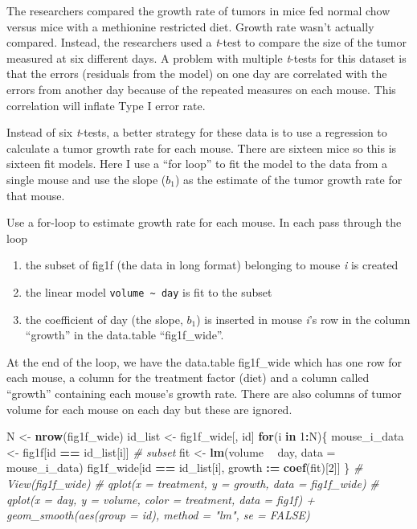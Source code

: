 \documentclass[]{book}
\newenvironment{Shaded}{\begin{snugshade}}{\end{snugshade}}
\newcommand{\CommentTok}[1]{\textcolor[rgb]{0.56,0.35,0.01}{\textit{#1}}}
\newcommand{\ControlFlowTok}[1]{\textcolor[rgb]{0.13,0.29,0.53}{\textbf{#1}}}
\newcommand{\DataTypeTok}[1]{\textcolor[rgb]{0.13,0.29,0.53}{#1}}
\newcommand{\DecValTok}[1]{\textcolor[rgb]{0.00,0.00,0.81}{#1}}
\newcommand{\ErrorTok}[1]{\textcolor[rgb]{0.64,0.00,0.00}{\textbf{#1}}}
\newcommand{\KeywordTok}[1]{\textcolor[rgb]{0.13,0.29,0.53}{\textbf{#1}}}
\newcommand{\NormalTok}[1]{#1}
\newcommand{\OperatorTok}[1]{\textcolor[rgb]{0.81,0.36,0.00}{\textbf{#1}}}
\newcommand{\StringTok}[1]{\textcolor[rgb]{0.31,0.60,0.02}{#1}}
\providecommand{\tightlist}{%
  \setlength{\itemsep}{0pt}\setlength{\parskip}{0pt}}
\begin{document}
The researchers compared the growth rate of tumors in mice fed normal chow versus mice with a methionine restricted diet. Growth rate wasn't actually compared. Instead, the researchers used a \emph{t}-test to compare the size of the tumor measured at six different days. A problem with multiple \emph{t}-tests for this dataset is that the errors (residuals from the model) on one day are correlated with the errors from another day because of the repeated measures on each mouse. This correlation will inflate Type I error rate.

Instead of six \emph{t}-tests, a better strategy for these data is to use a regression to calculate a tumor growth rate for each mouse. There are sixteen mice so this is sixteen fit models. Here I use a ``for loop'' to fit the model to the data from a single mouse and use the slope (\(b_1\)) as the estimate of the tumor growth rate for that mouse.

Use a for-loop to estimate growth rate for each mouse. In each pass through the loop

\begin{enumerate}
\def\labelenumi{\arabic{enumi}.}
\tightlist
\item
  the subset of fig1f (the data in long format) belonging to mouse \emph{i} is created
\item
  the linear model \texttt{volume\ \textasciitilde{}\ day} is fit to the subset
\item
  the coefficient of day (the slope, \(b_1\)) is inserted in mouse \emph{i}'s row in the column ``growth'' in the data.table ``fig1f\_wide''.
\end{enumerate}

At the end of the loop, we have the data.table fig1f\_wide which has one row for each mouse, a column for the treatment factor (diet) and a column called ``growth'' containing each mouse's growth rate. There are also columns of tumor volume for each mouse on each day but these are ignored.

\begin{Shaded}
\begin{Highlighting}[]
\NormalTok{N <-}\StringTok{ }\KeywordTok{nrow}\NormalTok{(fig1f_wide)}
\NormalTok{id_list <-}\StringTok{ }\NormalTok{fig1f_wide[, id]}
\ControlFlowTok{for}\NormalTok{(i }\ControlFlowTok{in} \DecValTok{1}\OperatorTok{:}\NormalTok{N)\{}
\NormalTok{  mouse_i_data <-}\StringTok{ }\NormalTok{fig1f[id }\OperatorTok{==}\StringTok{ }\NormalTok{id_list[i]] }\CommentTok{# subset}
\NormalTok{  fit <-}\StringTok{ }\KeywordTok{lm}\NormalTok{(volume }\OperatorTok{~}\StringTok{ }\NormalTok{day, }\DataTypeTok{data =}\NormalTok{ mouse_i_data)}
\NormalTok{  fig1f_wide[id }\OperatorTok{==}\StringTok{ }\NormalTok{id_list[i], growth }\OperatorTok{:}\ErrorTok{=}\StringTok{ }\KeywordTok{coef}\NormalTok{(fit)[}\DecValTok{2}\NormalTok{]]}
\NormalTok{\}}
\CommentTok{# View(fig1f_wide)}
\CommentTok{# qplot(x = treatment, y = growth, data = fig1f_wide)}
\CommentTok{# qplot(x = day, y = volume, color = treatment, data = fig1f) + geom_smooth(aes(group = id), method = "lm", se = FALSE)}
\end{Highlighting}
\end{Shaded}
\end{document}
